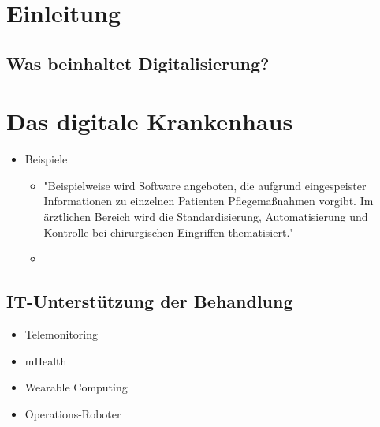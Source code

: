 
{}
\section{Einleitung}
	\subsection{Was beinhaltet Digitalisierung?}
	\parencite[11]{braeutigam2017}
\section{Das digitale Krankenhaus}
	\begin{itemize}
		\item Beispiele
		\begin{itemize}
			\item "Beispielweise wird Software angeboten, die aufgrund eingespeister Informationen zu einzelnen Patienten Pflegemaßnahmen vorgibt. Im ärztlichen Bereich wird die Standardisierung, Automatisierung und Kontrolle bei chirurgischen Eingriffen thematisiert." \parencite[16]{braeutigam2017}
			\item 
		\end{itemize}
	\end{itemize}
	\subsection{IT-Unterstützung der Behandlung}
	\parencite[51]{oswald2019} \parencite[14]{braeutigam2017}
	\begin{itemize}
		\item Telemonitoring
		\item mHealth
		\item Wearable Computing
		\item Operations-Roboter
	\end{itemize}
